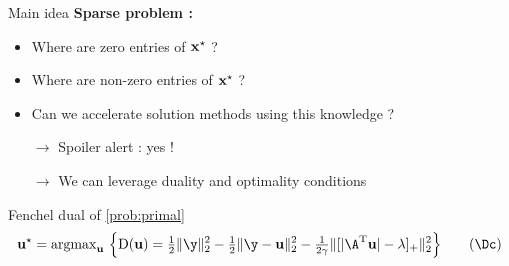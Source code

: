 \documentclass[10pt]{beamer}
\newcommand{\emphone}[1]{{\color{orange}#1}}
\begin{document}
\begin{frame}{Main idea}
  \textbf{Sparse problem :}
  \begin{itemize}
    \item Where are \emphone{zero} entries of $\mathbf{x}^{\star}$ ?
    \item Where are \emphone{non-zero} entries of $\mathbf{x}^{\star}$ ?
  \end{itemize}

  \vspace{-0.25cm}
  \pause

  \begin{itemize}
    \item Can we accelerate solution methods using this knowledge ?
  
  \end{itemize}
  
  \vspace{-0.25cm}
  \pause

  \begin{itemize}
    \item[$\rightarrow$] Spoiler alert : yes !
    \item[$\rightarrow$] We can leverage \emphone{duality} and \emphone{optimality conditions}
  \end{itemize}

  \vspace{0.5cm}
  \pause


  \begin{block}{Fenchel dual of \eqref{prob:primal}}
  \begin{equation}
    \label{prob:dual}
      \dvopt = \argmax_{\dv} \ 
      \Big\{
        \dfunc(\dv) = 
        \tfrac{1}{2} \norm{\obs}{2}^2 
        - \tfrac{1}{2}\norm{\obs - \dv}{2}^2 
        -\tfrac{1}{2\regtwo}
        \|[\abs{\ktranspose{\dic}\dv} - \regone]_+\|_2^2
      \Big\}
      \tag{\(\Dc\)}
  \end{equation}
\end{block}
\end{frame}
\end{document}

